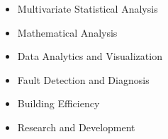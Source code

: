 

\begin{cvexpertise}
  \begin{itemize}
    \item Multivariate Statistical Analysis
    \item Mathematical Analysis
    \item Data Analytics and Visualization
    \vfill
    \item Fault Detection and Diagnosis
    \item Building Efficiency
    \item Research and Development
  \end{itemize}
\end{cvexpertise}

